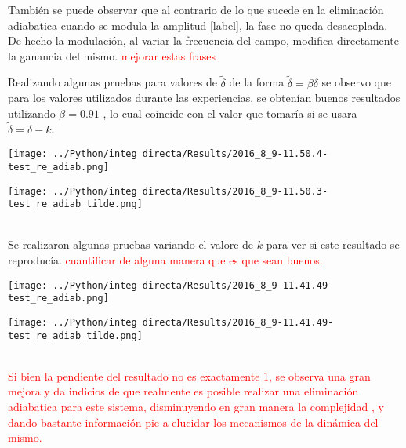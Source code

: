 	También se puede observar que al contrario de lo que sucede en la eliminación adiabatica cuando se modula la amplitud \ref{label}, la fase no queda desacoplada. 
	De hecho la modulación, al variar la frecuencia del campo, modifica directamente la ganancia del mismo.
	\textcolor{red}{mejorar estas frases}
	
	
	
	Realizando algunas pruebas para valores de $\tilde{\delta}$ de la forma $\tilde{\delta}=\beta \delta$ se observo que para los valores utilizados durante las experiencias, se obtenían buenos resultados utilizando $\beta=0.91$ , lo cual coincide con el valor que tomaría si se usara $\tilde{\delta}=\delta-k$.
	
	\begin{minipage}{0.33\textwidth}
		\centering
		\texttt{[image: ../Python/integ directa/Results/2016\_8\_9-11.50.4-test\_re\_adiab.png]}
	\end{minipage}
	\begin{minipage}{0.33\textwidth}
		\centering
		\texttt{[image: ../Python/integ directa/Results/2016\_8\_9-11.50.3-test\_re\_adiab\_tilde.png]}
	\end{minipage}\\
	
	Se realizaron algunas pruebas variando el valore de $k$ para ver si este resultado se reproducía.   
	\textcolor{red}{cuantificar de alguna manera que es que sean buenos.}
	
		\begin{minipage}{0.33\textwidth}
			\centering
			\texttt{[image: ../Python/integ directa/Results/2016\_8\_9-11.41.49-test\_re\_adiab.png]}
		\end{minipage}
		\begin{minipage}{0.33\textwidth}
			\centering
			\texttt{[image: ../Python/integ directa/Results/2016\_8\_9-11.41.49-test\_re\_adiab\_tilde.png]}
		\end{minipage}\\
	
	\textcolor{red}{Si bien la pendiente del resultado no es exactamente 1, se observa una gran mejora y da indicios de que realmente es posible realizar una eliminación adiabatica para este sistema, disminuyendo en gran manera la complejidad , y dando bastante información pie a elucidar los mecanismos de la dinámica del mismo.}
	
	
	
	
	